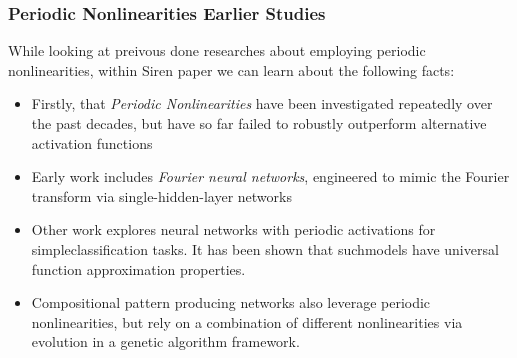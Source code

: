 



\begin{frame}
\frametitle{Periodic Nonlinearities Earlier Studies}
While looking at preivous done researches about employing periodic nonlinearities, within Siren paper we can learn about the following facts:

\begin{itemize}
\item Firstly, that \textit{Periodic Nonlinearities} have been investigated repeatedly over the past decades, but have so far failed to robustly outperform alternative activation functions
\item  Early work includes \textit{Fourier neural networks}, engineered to mimic the Fourier transform via single-hidden-layer networks
\item Other work explores neural networks with periodic activations for simpleclassification tasks. It has been shown that suchmodels have universal function approximation properties.
\item Compositional pattern producing networks also  leverage  periodic  nonlinearities,  but  rely  on  a  combination  of  different nonlinearities via evolution in a genetic algorithm framework.
\end{itemize}

\end{frame}